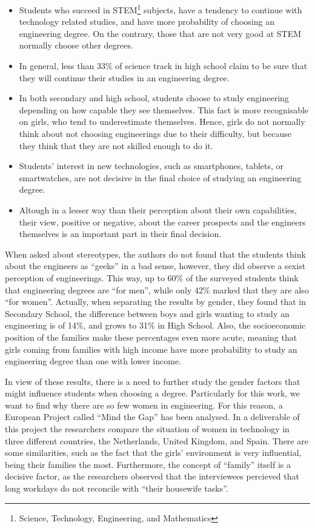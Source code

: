 \documentclass[journal,transmag]{IEEEtran}
\begin{document}
\begin{itemize}
	\item Students who succeed in STEM\footnote{Science, Technology, Engineering, and Mathematics} subjects, have a tendency to continue with technology related studies, and have more probability of choosing an engineering degree. On the contrary, those that are not very good at STEM normally choose other degrees.
	\item In general, less than 33\% of science track in high school claim to be sure that they will continue their studies in an engineering degree.
	\item In both secondary and high school, students choose to study engineering depending on how capable they see themselves. This fact is more recognisable on girls, who tend to underestimate themselves. Hence, girls do not normally think about not choosing engineerings due to their difficulty, but because they think that they are not skilled enough to do it.
	\item Students' interest in new technologies, such as smartphones, tablets, or smartwatches, are not decisive in the final choice of studying an engineering degree.
	\item Altough in a lesser way than their perception about their own capabilities, their view, positive or negative, about the career prospects and the engineers themselves is an important part in their final decision.
\end{itemize}

When asked about stereotypes, the authors do not found that the students think about the engineers as ``geeks'' in a bad sense, however, they did observe a sexist perception of engineerings. This way, up to 60\% of the surveyed students think that engineering degrees are ``for men'', while only 42\% marked that they are also ``for women''. Actually, when separating the results by gender, they found that in Secondary School, the difference between boys and girls wanting to study an engineering is of 14\%, and grows to 31\% in High School. Also, the socioeconomic position of the families make these percentages even more acute, meaning that girls coming from families with high income have more probability to study an engineering degree than one with lower income.

In view of these results, there is a need to further study the gender factors that might influence students when choosing a degree. Particularly for this work, we want to find why there are so few women in engineering. For this reason, a European Project called ``Mind the Gap'' has been analysed. In a deliverable of this project \cite{mtg2015} the researchers compare the situation of women in technology in three different countries, the Netherlands, United Kingdom, and Spain.
There are some similarities, such as the fact that the girls' environment is very influential, being their families the most. Furthermore, the concept of ``family'' itself is a decisive factor, as the researchers observed that the interviewees percieved that long workdays do not reconcile with ``their housewife tasks''.
\end{document}

